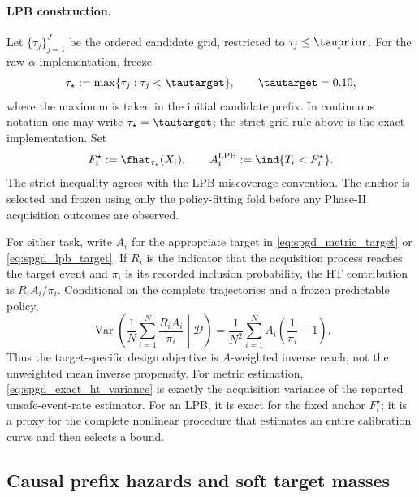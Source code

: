 \paragraph{LPB construction.}
Let $\{\tau_j\}_{j=1}^{J}$ be the ordered candidate grid, restricted to
$\tau_j\leq\tauprior$.  For the raw-$\alpha$ implementation, freeze
\begin{equation}
    \tau_\star
    :=\max\{\tau_j:\tau_j<\tautarget\},
    \qquad \tautarget=0.10,
    \label{eq:spgd_raw_alpha_anchor}
\end{equation}
where the maximum is taken in the initial candidate prefix.  In continuous
notation one may write $\tau_\star=\tautarget$; the strict grid rule above is
the exact implementation.  Set
\begin{equation}
    F_i^\star:=\fhat_{\tau_\star}(X_i),
    \qquad
    A_i^{\mathrm{LPB}}
    :=\ind{T_i<F_i^\star}.
    \label{eq:spgd_lpb_target}
\end{equation}
The strict inequality agrees with the LPB miscoverage convention.  The anchor
is selected and frozen using only the policy-fitting fold before any Phase-II
acquisition outcomes are observed.

For either task, write $A_i$ for the appropriate target in
\eqref{eq:spgd_metric_target} or \eqref{eq:spgd_lpb_target}.  If $R_i$ is the
indicator that the acquisition process reaches the target event and
$\pi_i$ is its recorded inclusion probability, the HT contribution is
$R_iA_i/\pi_i$.  Conditional on the complete trajectories and a frozen
predictable policy,
\begin{equation}
    \operatorname{Var}\!\left(
      \frac{1}{N}\sum_{i=1}^{N}\frac{R_iA_i}{\pi_i}
      \middle|\mathcal D
    \right)
    =\frac{1}{N^2}\sum_{i=1}^{N}
      A_i\left(\frac{1}{\pi_i}-1\right).
    \label{eq:spgd_exact_ht_variance}
\end{equation}
Thus the target-specific design objective is $A$-weighted inverse reach, not
the unweighted mean inverse propensity.  For metric estimation,
\eqref{eq:spgd_exact_ht_variance} is exactly the acquisition variance of the
reported unsafe-event-rate estimator.  For an LPB, it is exact for the fixed
anchor $F_i^\star$; it is a proxy for the complete nonlinear procedure that
estimates an entire calibration curve and then selects a bound.

\subsection{Causal prefix hazards and soft target masses}

